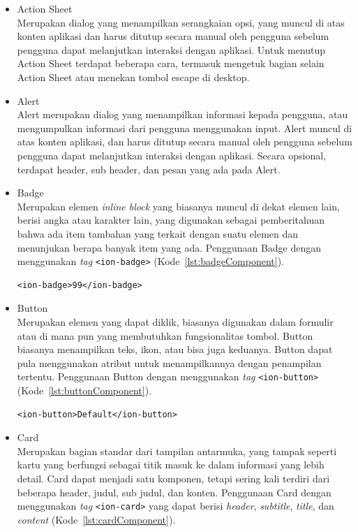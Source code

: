 \begin{itemize}
	\item Action Sheet \\
	Merupakan dialog yang menampilkan serangkaian opsi, yang muncul di atas konten aplikasi dan harus ditutup secara manual oleh pengguna sebelum pengguna dapat melanjutkan interaksi dengan aplikasi. Untuk menutup Action Sheet terdapat beberapa cara, termasuk mengetuk bagian selain Action Sheet atau menekan tombol escape di desktop.

	\item Alert \\
	Alert merupakan dialog yang menampilkan informasi kepada pengguna, atau mengumpulkan informasi dari pengguna menggunakan input. Alert muncul di atas konten aplikasi, dan harus ditutup secara manual oleh pengguna sebelum pengguna dapat melanjutkan interaksi dengan aplikasi. Secara opsional, terdapat header, sub header, dan pesan yang ada pada Alert.
	\item Badge \\
	Merupakan elemen {\it inline block} yang biasanya muncul di dekat elemen lain, berisi angka atau karakter lain, yang digunakan sebagai pemberitahuan bahwa ada item tambahan yang terkait dengan suatu elemen dan menunjukan berapa banyak item yang ada. Penggunaan Badge dengan menggunakan {\it tag} \texttt{<ion-badge>} (Kode~\ref{lst:badgeComponent}).
\begin{lstlisting}[label={lst:badgeComponent}, caption=Potongan Kode Program dari Badge Component]
<ion-badge>99</ion-badge>
\end{lstlisting} 
	\item Button \\
	Merupakan elemen yang dapat diklik, biasanya digunakan dalam formulir atau di mana pun yang membutuhkan fungsionalitas tombol. Button biasanya menampilkan teks, ikon, atau bisa juga keduanya. Button dapat pula menggunakan atribut untuk menampilkannya dengan penampilan tertentu. Penggunaan Button dengan menggunakan {\it tag} \texttt{<ion-button>} (Kode~\ref{lst:buttonComponent}). 
\begin{lstlisting}[label={lst:buttonComponent}, caption=Potongan Kode Program dari Button Component]
<ion-button>Default</ion-button>
\end{lstlisting} 

	\item Card \\
	Merupakan bagian standar dari tampilan antarmuka, yang tampak seperti kartu yang berfungsi sebagai titik masuk ke dalam informasi yang lebih detail. Card dapat menjadi satu komponen, tetapi sering kali terdiri dari beberapa header, judul, sub judul, dan konten. Penggunaan Card dengan menggunakan {\it tag} \texttt{<ion-card>} yang dapat berisi {\it header}, {\it subtitle}, {\it title}, dan {\it content} (Kode~\ref{lst:cardComponent}).


\end{itemize}
